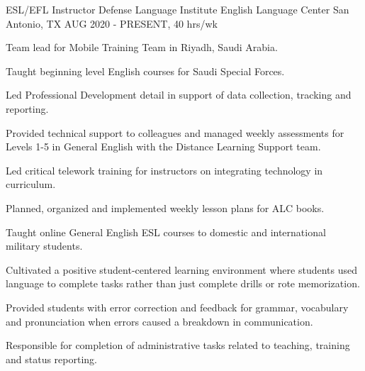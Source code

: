


\begin{cventries}


\cventry
{ESL/EFL Instructor} %
{Defense Language Institute English Language Center} %
{San Antonio, TX} %
{AUG 2020 - PRESENT, 40 hrs/wk} %
{ %
\begin{cvitems}
\item {Team lead for Mobile Training Team in Riyadh, Saudi Arabia.}
\item {Taught beginning level English courses for Saudi Special Forces.}
\item {Led Professional Development detail in support of data collection, tracking and reporting.}
\item {Provided technical support to colleagues and managed weekly assessments for Levels 1-5 in General English with the Distance Learning Support team.}
\item {Led critical telework training for instructors on integrating technology in curriculum.}
\item {Planned, organized and implemented weekly lesson plans for ALC books.}
\item {Taught online General English ESL courses to domestic and international military students.}
\item {Cultivated a positive student-centered learning environment where students used language to complete tasks rather than just complete drills or rote memorization.}
\item {Provided students with error correction and feedback for grammar, vocabulary and pronunciation when errors caused a breakdown in communication.}
\item {Responsible for completion of administrative tasks related to teaching, training and status reporting.} 
\end{cvitems}
}


\end{cventries}
